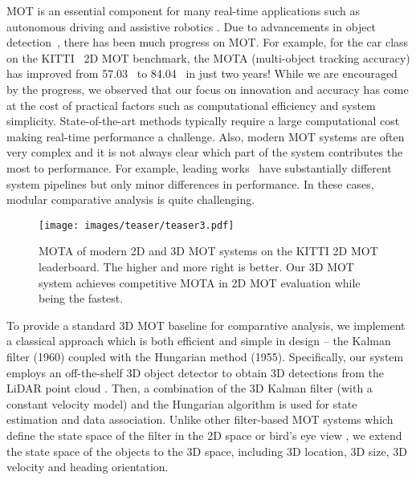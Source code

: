 \documentclass[letterpaper, 10 pt, conference]{ieeeconf}
\begin{document}
MOT is an essential component for many real-time applications such as autonomous driving \cite{Wang2018, Weng2020_spcsf} and assistive robotics \cite{Sun2020_imuvisual, Manglik2019}. Due to advancements in object detection~\cite{Ren2015, Shi2019, Lee2016, Weng20182}, there has been much progress on MOT. For example, for the car class on the KITTI~\cite{Geiger2012} 2D MOT benchmark, the MOTA (multi-object tracking accuracy) has improved from 57.03~\cite{Yoon2016} to 84.04~\cite{Karunasekera2019} in just two years! While we are encouraged by the progress, we observed that our focus on innovation and accuracy has come at the cost of practical factors such as computational efficiency and system simplicity. State-of-the-art methods typically require a large computational cost \cite{Sharma2018, Tian2019, Frossard2018, Baser2019} making real-time performance a challenge. Also, modern MOT systems are often very complex and it is not always clear which part of the system contributes the most to performance. For example, leading works~\cite{Baser2019, Frossard2018, Scheidegger2018} have substantially different system pipelines but only minor differences in performance. In these cases, modular comparative analysis is quite challenging. 


\begin{figure}[t]
\centering
\texttt{[image: images/teaser/teaser3.pdf]}
\vspace{-0.6cm}
\caption{MOTA of modern 2D and 3D MOT systems on the KITTI 2D MOT leaderboard. The higher and more right is better. Our 3D MOT system achieves competitive MOTA in 2D MOT evaluation while being the fastest.}
\vspace{-0.5cm}
\label{fig:teaser}
\end{figure}

To provide a standard 3D MOT baseline for comparative analysis, we implement a classical approach which is both efficient and simple in design -- the Kalman filter \cite{Kalman1960} (1960) coupled with the Hungarian method \cite{WKuhn1955} (1955). Specifically, our system employs an off-the-shelf 3D object detector to obtain 3D detections from the LiDAR point cloud \cite{Shi2019}. Then, a combination of the 3D Kalman filter (with a constant velocity model) and the Hungarian algorithm is used for state estimation and data association. Unlike other filter-based MOT systems which define the state space of the filter in the 2D space \cite{Bewley2016} or bird's eye view \cite{Patil2019}, we extend the state space of the objects to the 3D space, including 3D location, 3D size, 3D velocity and heading orientation. 
\end{document}
